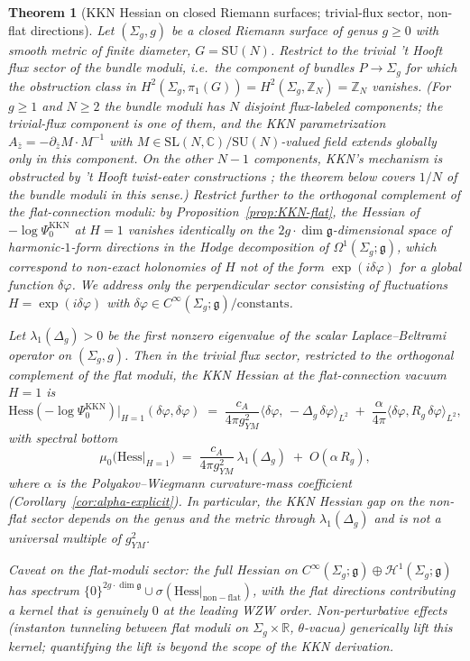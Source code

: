 \documentclass[11pt,letterpaper]{article}
\newtheorem{theorem}{Theorem}[section]
\theoremstyle{definition}
\newcommand{\bbR}{\mathbb{R}}
\newcommand{\bbC}{\mathbb{C}}
\newcommand{\bbZ}{\mathbb{Z}}
\newcommand{\cH}{\mathcal{H}}
\newcommand{\fg}{\mathfrak{g}}
\newcommand{\Hess}{\mathrm{Hess}}
\newcommand{\Lap}{\Delta}
\begin{document}
\begin{theorem}[KKN Hessian on closed Riemann surfaces; trivial-flux sector, non-flat directions]\label{thm:KKN-curved}
Let $(\Sigma_g, g)$ be a closed Riemann surface of genus $g\ge 0$ with smooth metric of finite diameter, $G = \mathrm{SU}(N)$. Restrict to the \emph{trivial 't Hooft flux sector} of the bundle moduli, i.e.\ the component of bundles $P\to\Sigma_g$ for which the obstruction class in $H^2(\Sigma_g, \pi_1(G)) = H^2(\Sigma_g, \bbZ_N) = \bbZ_N$ vanishes. (For $g \ge 1$ and $N \ge 2$ the bundle moduli has $N$ disjoint flux-labeled components; the trivial-flux component is one of them, and the KKN parametrization $A_{\bar z} = -\partial_{\bar z} M \cdot M^{-1}$ with $M \in \mathrm{SL}(N,\bbC)/\mathrm{SU}(N)$-valued field extends globally only in this component. On the other $N-1$ components, KKN's mechanism is obstructed by 't Hooft twist-eater constructions \cite{vanBaal1982}; the theorem below covers $1/N$ of the bundle moduli in this sense.) Restrict further to the \emph{orthogonal complement of the flat-connection moduli}: by Proposition~\ref{prop:KKN-flat}, the Hessian of $-\log\Psi_0^{\mathrm{KKN}}$ at $H=1$ \emph{vanishes identically} on the $2g\cdot\dim\fg$-dimensional space of harmonic-$1$-form directions in the Hodge decomposition of $\Omega^1(\Sigma_g;\fg)$, which correspond to non-exact holonomies of $H$ not of the form $\exp(i\delta\varphi)$ for a global function $\delta\varphi$. We address only the perpendicular sector consisting of fluctuations $H = \exp(i\delta\varphi)$ with $\delta\varphi \in C^\infty(\Sigma_g; \fg)/\mathrm{constants}$.

\smallskip
Let $\lambda_1(\Delta_g) > 0$ be the first nonzero eigenvalue of the scalar Laplace--Beltrami operator on $(\Sigma_g, g)$. Then in the trivial flux sector, restricted to the orthogonal complement of the flat moduli, the KKN Hessian at the flat-connection vacuum $H = 1$ is
\[
\Hess(-\log\Psi_0^{\mathrm{KKN}})\bigl|_{H=1}(\delta\varphi,\delta\varphi)
\;=\; \frac{c_A}{4\pi g^2_{YM}}\bigl\langle \delta\varphi,\,-\Lap_g\,\delta\varphi\bigr\rangle_{L^2}
\;+\; \frac{\alpha}{4\pi}\bigl\langle\delta\varphi, R_g\,\delta\varphi\bigr\rangle_{L^2},
\]
with spectral bottom
\[
\mu_0\bigl(\Hess|_{H=1}\bigr) \;=\; \frac{c_A}{4\pi g^2_{YM}}\,\lambda_1(\Delta_g) \;+\; O(\alpha\,R_g),
\]
where $\alpha$ is the Polyakov--Wiegmann curvature-mass coefficient (Corollary~\ref{cor:alpha-explicit}). In particular, the KKN Hessian gap on the non-flat sector depends on the genus and the metric through $\lambda_1(\Delta_g)$ and is \emph{not} a universal multiple of $g^2_{YM}$.

\smallskip
\emph{Caveat on the flat-moduli sector:} the full Hessian on $C^\infty(\Sigma_g; \fg) \oplus \cH^1(\Sigma_g;\fg)$ has spectrum $\{0\}^{2g\cdot\dim\fg} \cup \sigma(\Hess|_{\mathrm{non-flat}})$, with the flat directions contributing a kernel that is genuinely $0$ at the leading WZW order. Non-perturbative effects (instanton tunneling between flat moduli on $\Sigma_g \times \bbR$, $\theta$-vacua) generically lift this kernel; quantifying the lift is beyond the scope of the KKN derivation.
\end{theorem}
\end{document}
